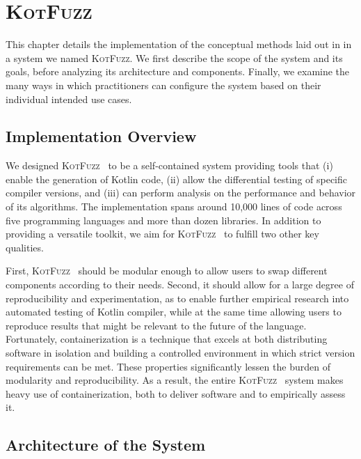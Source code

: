 \newcommand{\kf}{\textsc{KotFuzz}}

\chapter{\label{cha:tool} \kf}

This chapter details the implementation of the conceptual methods
laid out in  in a system
we named \kf.
We first describe the scope of the system and its goals,
before analyzing its architecture and components.
Finally, we examine the many ways in which practitioners
can configure the system based on their individual intended use cases.

\section{\label{sec:overview}Implementation Overview}

We designed \kf~ to be a self-contained system providing tools
that (i) enable the generation of Kotlin code,
(ii) allow the differential testing of specific compiler versions,
and (iii) can perform analysis on the performance
and behavior of its algorithms.
The implementation spans around 10,000 lines of code
across five programming languages and more than dozen libraries.
In addition to providing a versatile toolkit, we aim for
\kf~ to fulfill two other key qualities.

First, \kf~ should be modular enough to allow users
to swap different components according to their needs.
Second, it should allow for a large degree of reproducibility
and experimentation, as to enable further empirical research into 
automated testing of Kotlin compiler, while at the same time
allowing users to reproduce results that might be relevant to the
future of the language.
Fortunately, containerization is a technique that excels
at both distributing software in isolation and building a controlled
environment in which strict version requirements can be met.
These properties significantly lessen the burden of modularity
and reproducibility.
As a result, the entire \kf~ system makes heavy use of containerization,
both to deliver software and to empirically assess it.


\section{\label{sec:architecture}Architecture of the System}

